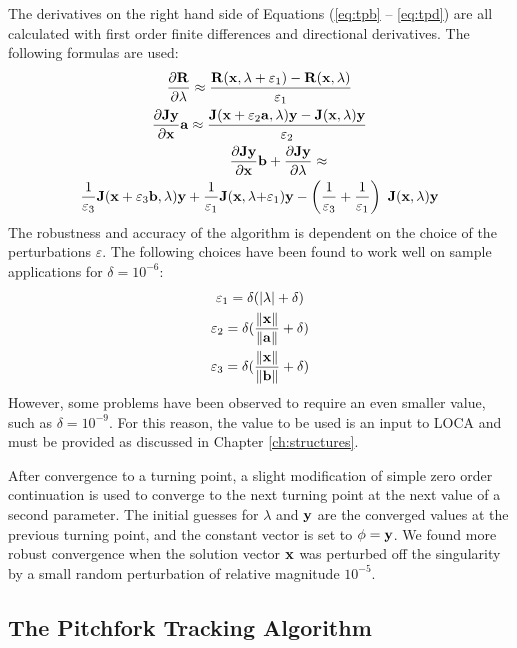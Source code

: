 The derivatives on the right hand side of Equations (\ref{eq:tpb} -- \ref{eq:tpd}) are all calculated with first order finite differences and directional derivatives. The following formulas are used:
\begin{gather}
\label{eq:tpdiff}
\frac{\partial {\bf R}}{\partial \lambda} \approx { { {\bf R}( {\bf x},\lambda + \varepsilon_1) -  {\bf R}( {\bf x},\lambda)} \over {\varepsilon_1}} \\
\frac{\partial {\bf J} {\bf y}}{\partial {\bf x}} {\bf a} \approx { { {\bf J}( {\bf x}+ \varepsilon_2  {\bf a},\lambda)  {\bf y}-  {\bf J}( {\bf x},\lambda)  {\bf y}} \over {\varepsilon_2}} \\
\begin{split}
\frac{\partial {\bf J} {\bf y}}{\partial {\bf x}} {\bf b} & + \frac{\partial {\bf J} {\bf y}}{\partial \lambda} \approx  \\
{1 \over \varepsilon_3}{\bf J}({\bf x} + \varepsilon_3 {\bf b},\lambda) {\bf y}
+ {1 \over \varepsilon_1}{\bf J}({\bf x},\lambda + &\varepsilon_1) {\bf y}
- \left( {1 \over \varepsilon_3} + {1 \over \varepsilon_1}\right)\
{\bf J}({\bf x},\lambda) {\bf y} 
\end{split}
\end{gather}
The robustness and accuracy of the algorithm is dependent on the choice of the perturbations $\varepsilon$. The following choices have been found to work well on sample applications for $\delta=10^{-6}$:
\begin{gather}
\label{eq:tppert}
\varepsilon_1 = \delta (|\lambda| + \delta) \\
\varepsilon_2 = \delta ({\|{\bf x}\| \over \|{\bf a}\|} + \delta) \\
\varepsilon_3 = \delta ({\|{\bf x}\| \over \|{\bf b}\|} + \delta)
\end{gather}
However, some problems have been observed to require an even smaller value, such as $\delta=10^{-9}$. For this reason, the value to be used is an input to LOCA and must be provided as discussed in Chapter \ref{ch:structures}.

After convergence to a turning point, a slight modification of simple zero order continuation is used to converge to the next turning point at the next value of a second parameter. The initial guesses for $\lambda$ and ${\bf y}$ are the converged values at the previous turning point, and the constant vector is set to $\phi={\bf y}$. We found more robust convergence when the solution vector ${\bf x}$ was perturbed off the singularity by a small random perturbation of relative magnitude $10^{-5}$.


\subsection{The Pitchfork Tracking Algorithm}
\label{sec:pf}

